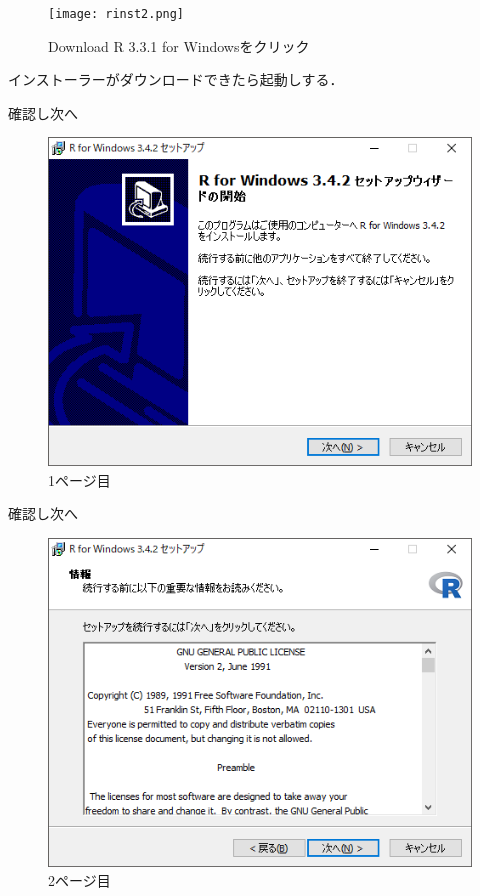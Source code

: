 \begin{figure}[htbp]
\centering 
\texttt{[image: rinst2.png]}
\caption{Download R 3.3.1 for Windowsをクリック}
\end{figure}

\newpage

インストーラーがダウンロードできたら起動しする．

確認し次へ
\begin{figure}[!htbp]
\centering 
\includegraphics[width=13cm]{rinstall1.png}
\caption{1ページ目}
\end{figure}

\newpage
確認し次へ
\begin{figure}[!htbp]
\centering 
\includegraphics[width=13cm]{rinstall2.png}
\caption{2ページ目}
\end{figure}

